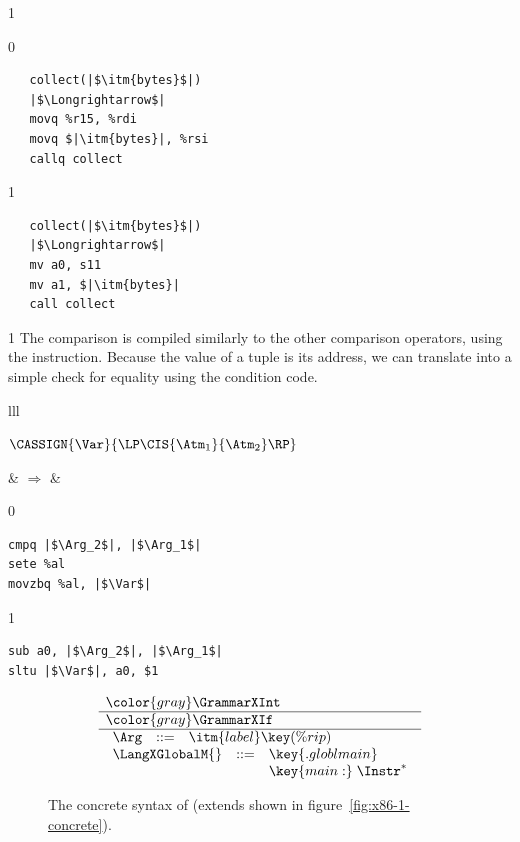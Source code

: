 \documentclass[7x10]{TimesAPriori_MIT}%
\newcommand{\gray}[1]{{\color{gray} #1}}
\def\pythonEd{1}
\def\edition{1}
\def\xeightysixEd{0}
\def\riscvEd{1}
\def\architecture{1}
\newcommand{\pythonColor}[0]{}
\numberwithin{theorem}{chapter}
\numberwithin{definition}{chapter}
\numberwithin{equation}{chapter}
\begin{document}
{\if\edition\pythonEd\pythonColor    
{\if\architecture\xeightysixEd
\begin{lstlisting}
   collect(|$\itm{bytes}$|)
   |$\Longrightarrow$|
   movq %r15, %rdi
   movq $|\itm{bytes}|, %rsi
   callq collect
\end{lstlisting}
  \fi}
{\if\architecture\riscvEd
\begin{lstlisting}
   collect(|$\itm{bytes}$|)
   |$\Longrightarrow$|
   mv a0, s11
   mv a1, $|\itm{bytes}|
   call collect
\end{lstlisting}
  \fi}
\fi}

{\if\edition\pythonEd\pythonColor    
The  comparison is compiled similarly to the other comparison
operators, using the  instruction. Because the value of a
tuple is its address, we can translate  into a simple check
for equality using the  condition code. \\
\begin{tabular}{lll}
\begin{minipage}{0.4\textwidth}
$\CASSIGN{\Var}{ \LP\CIS{\Atm_1}{\Atm_2} \RP }$ 
\end{minipage}
&
$\Rightarrow$
&
\begin{minipage}{0.4\textwidth}
{\if\architecture\xeightysixEd
\begin{lstlisting}
cmpq |$\Arg_2$|, |$\Arg_1$|
sete %al
movzbq %al, |$\Var$|
\end{lstlisting}
  \fi}
{\if\architecture\riscvEd
\begin{lstlisting}
sub a0, |$\Arg_2$|, |$\Arg_1$|
sltu |$\Var$|, a0, $1
\end{lstlisting}
  \fi}
\end{minipage}
\end{tabular}
\fi}


\newcommand{\GrammarXGlobal}{
\begin{array}{lcl}
  \Arg &::=& \itm{label} \key{(\%rip)} 
\end{array}
}

\newcommand{\ASTXGlobalRacket}{
\begin{array}{lcl}
  \Arg &::=&  \GLOBAL{\itm{label}} 
\end{array}
}


\begin{figure}[tp]
  \begin{tcolorbox}[colback=white]
\[
\begin{array}{l}
  \gray{\GrammarXInt} \\ \hline
  \gray{\GrammarXIf} \\ \hline
  \GrammarXGlobal \\
\begin{array}{lcl}
\LangXGlobalM{} &::= &  \key{.globl main} \\
      &    &  \key{main:} \; \Instr^{*} 
\end{array}
\end{array}
\]
  \end{tcolorbox}
\caption{The concrete syntax of \LangXGlobal{}  (extends \LangXIf{} shown in figure~\ref{fig:x86-1-concrete}).}
\label{fig:x86-2-concrete}
\end{figure}
\end{document}
